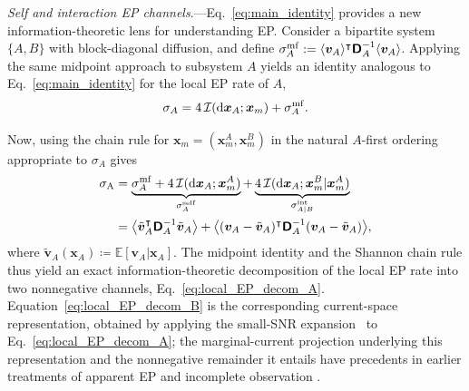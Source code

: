\documentclass[
 longbibliography,
 twocolumn,
 superscriptaddress,
 amsmath,
 amssymb,
 amsthm,
 amsfonts,
 prl,
 floatfix,
]{revtex4-2}
\newcommand{\matbf}[1]{\boldsymbol{\mathsf{#1}}}
\begin{document}
\textit{Self and interaction EP channels}.---Eq.~\eqref{eq:main_identity} provides a new information-theoretic lens for understanding EP.
Consider a bipartite system $\{A,B\}$ with block-diagonal diffusion, and define
$\sigma_A^{\rm mf}:=\langle\bm v_A\rangle^\intercal\matbf D_A^{-1}\langle\bm v_A\rangle$.
Applying the same midpoint approach to subsystem $A$ yields an identity analogous to Eq.~\eqref{eq:main_identity} for the local EP rate of $A$,
\begin{equation}
    \sigma_A=4\,\mathcal I(\mathrm d\bm x_A;\bm x_m)
    +\sigma_A^{\rm mf}.
    \label{eq:local_EP_identity}
\end{equation}

Now, using the chain rule for $\bm{x}_m=(\bm{x}_m^A,\bm{x}_m^B)$ in the natural $A$-first ordering appropriate to $\sigma_A$ gives
\begin{subequations}\label{eq:local_EP_decom}
\renewcommand{\theequation}{\theparentequation\alph{equation}}
\begin{align}
    \sigma_\mathrm{A} 
    &= \underbrace{\sigma_A^{\rm mf} + 4\,\mathcal{I}(\mathrm{d}\bm{x}_A;\bm{x}_m^A)
    }_{\sigma_A^{\rm self}}
    +\underbrace{4\,\mathcal{I}(\mathrm{d}\bm{x}_A;\bm{x}_m^B|\bm{x}_m^A)}_{\sigma_{A|B}^{\rm int}}
    \label{eq:local_EP_decom_A}
    \\
    &=\big\langle\tilde{\bm v}_A^\intercal\matbf D_A^{-1}\tilde{\bm v}_A\big\rangle
    +\big\langle(\bm v_A-\tilde{\bm v}_A)^\intercal\matbf D_A^{-1}(\bm v_A-\tilde{\bm v}_A)\big\rangle,
    \label{eq:local_EP_decom_B}
\end{align}
\end{subequations}
where $\tilde{\bm v}_A(\bm x_A)\coloneq\mathbb E[\bm v_A|\bm x_A]$.
The midpoint identity and the Shannon chain rule thus yield an exact information-theoretic decomposition of the local EP rate into two nonnegative channels, Eq.~\eqref{eq:local_EP_decom_A}.
Equation~\eqref{eq:local_EP_decom_B} is the corresponding current-space representation, obtained by applying the small-SNR expansion~\cite{guo2005mutual} to Eq.~\eqref{eq:local_EP_decom_A}; 
the marginal-current projection underlying this representation and the nonnegative remainder it entails have precedents in earlier treatments of apparent EP and incomplete observation \cite{nakazato2021geometrical,frishman2020learning}.
\end{document}
